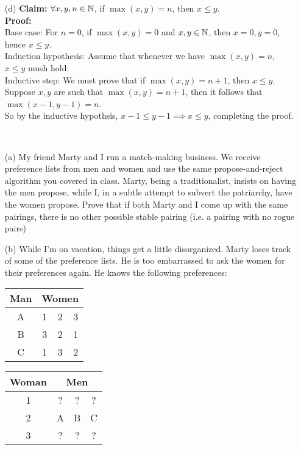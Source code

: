 \documentclass[11pt]{article}
\newif\ifsolutions
\begin{document}
\begin{qunlist}
\begin{itemize}
\ifsolutions
\textbf{Solutions:} This proof is correct.
\fi


\item[(d)]\textbf{Claim:} $\forall x,y,n \in \mathbb{N}$, if $\max(x,y) = n$, then $x \leq y$. \\
\textbf{Proof:} \\
Base case: For $n=0$, if $\max(x,y) = 0$ and $x,y \in \mathbb{N}$, then $x=0, y=0$, hence $x \leq y$. \\
Induction hypothesis: Assume that whenever we have $\max(x,y) = n$, $x \leq y$ mush hold. \\
Inductive step: We must prove that if $\max(x,y) = n+1$, then $x \leq y$. \\
Suppose $x,y$ are such that $\max(x,y) = n+1$, then it follows that $\max(x-1,y-1) = n$. \\
So by the inductive hypothsis, $x-1 \leq y-1  \implies x \leq y$, completing the proof.

\ifsolutions
\textbf{Solutions:}
\fi


\end{itemize}




 \\ 

\begin{itemize}
\item[(a)] My friend Marty and I run a match-making business. We receive preference lists from men and women and use the same propose-and-reject algorithm you covered in class. Marty, being a traditionalist, insists on having the men propose, while I, in a subtle attempt to subvert the patriarchy, have the women propose. Prove that if both Marty and I come up with the same pairings, there is no other possible stable pairing (i.e. a pairing with no rogue pairs)

\item[(b)] While I'm on vacation, things get a little disorganized. Marty loses track of some of the preference lists. He is too embarrassed to ask the women for their preferences again. He knows the following preferences:

\begin{center}
\begin{tabular}{|c|ccc|}\hline 
Man&\multicolumn{3}{|c|}{Women}\\\hline 
A&1&2&3\\\hline 
B&3&2&1\\\hline 
C&1&3&2\\\hline
\end{tabular} 
\hspace{2cm}
\begin{tabular}{|c|ccc|}\hline 
Woman&\multicolumn{3}{|c|}{Men}\\\hline 
1&?&?&?\\\hline 
2&A&B&C\\\hline 
3&?&?&?\\\hline
\end{tabular}
\end{center}
   

\end{itemize}
\end{qunlist}
\end{document}
